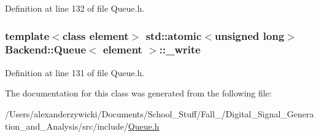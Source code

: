 Definition at line 132 of file Queue.\+h.

\hypertarget{class_backend_1_1_queue_ab3d5c4738092cf356b36c56f6ab61554}{
\subsubsection[{\+\_\+write}]{\setlength{\rightskip}{0pt plus 5cm}template$<$class element$>$ std\+::atomic$<$unsigned long$>$ {\bf Backend\+::\+Queue}$<$ element $>$\+::\+\_\+write\hspace{0.3cm}{\ttfamily [protected]}}}\label{class_backend_1_1_queue_ab3d5c4738092cf356b36c56f6ab61554}


Definition at line 131 of file Queue.\+h.



The documentation for this class was generated from the following file\+:\begin{DoxyCompactItemize}
\item 
/\+Users/alexanderzywicki/\+Documents/\+School\+\_\+\+Stuff/\+Fall\+\_/\+Digital\+\_\+\+Signal\+\_\+\+Generation\+\_\+and\+\_\+\+Analysis/src/include/\hyperlink{_queue_8h}{Queue.\+h}\end{DoxyCompactItemize}
